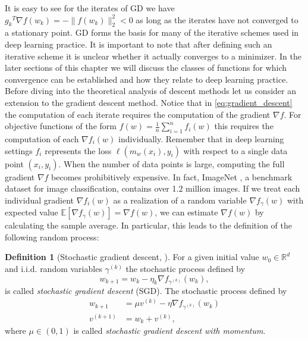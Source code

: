 \documentclass[12pt]{article}
\theoremstyle{definition}
\newtheorem{definition}[definition]{Definition}
\numberwithin{equation}{section}
\newcommand{\ev}[1]{\mathbb{E}\left[{#1}\right]}
\newcommand{\norm}[1]{\lVert{#1}\rVert_2}
\begin{document}
It is easy to see for the iterates of GD we have ${g_k}^T \nabla f(w_{k}) = -\norm{ f(w_{k}) }^2 < 0$ as long as the iterates have not converged to a stationary point. GD forms the basis for many of the iterative schemes used in deep learning practice. It is important to note that after defining such an iterative scheme it is unclear whether it actually converges to a minimizer. In the later sections of this chapter we will discuss the classes of functions for which convergence can be established and how they relate to deep learning practice. Before diving into the theoretical analysis of descent methods let us consider an extension to the gradient descent method.
Notice that in \eqref{eq:gradient_descent} the computation of each iterate requires the computation of the gradient $\nabla f$. For objective functions of the form $f(w) = \frac{1}{n} \sum_{i=1}^n f_i(w)$ this requires the computation of each $\nabla f_i(w)$ individually. Remember that in deep learning settings $f_i$ represents the loss $\ell(m_w(x_i), y_i)$ with respect to a single data point $(x_i, y_i)$. When the number of data points is large, computing the full gradient $\nabla f$ becomes prohibitively expensive. In fact, ImageNet \cite{dengImageNetLargescaleHierarchical2009}, a benchmark dataset for image classification, contains over 1.2 million images. If we treat each individual gradient $\nabla f_i(w)$ as a realization of a random variable $\nabla f_{\gamma}(w)$ with expected value $\ev{\nabla f_{\gamma}(w)} = \nabla f(w)$, we can estimate $\nabla f(w)$ by calculating the sample average. In particular, this leads to the definition of the following random process:
\begin{definition}[Stochastic gradient descent, ]
  \label{def:sgd}
  For a given initial value $w_{0} \in \mathbb{R}^d$ and i.i.d. random variables $\gamma^{(k)}$ the stochastic process defined by
  \begin{equation}
    \label{eq:stochastic_gradient_descent}
    w_{k+1} = w_{k} - \eta_k \nabla f_{\gamma^{(k)}}(w_{k}),
  \end{equation}
  is called \emph{stochastic gradient descent} (SGD).
  The stochastic process defined by
  \begin{align*}
    w_{k+1} &= \mu v^{(k)} - \eta \nabla f_{\gamma^{(k)}}(w_{k}) \\
    v^{(k+1)} &= w_{k} + v^{(k)},
  \end{align*}
  where $\mu \in (0,1)$ is called \emph{stochastic gradient descent with momentum}. 
\end{definition}
\end{document}
